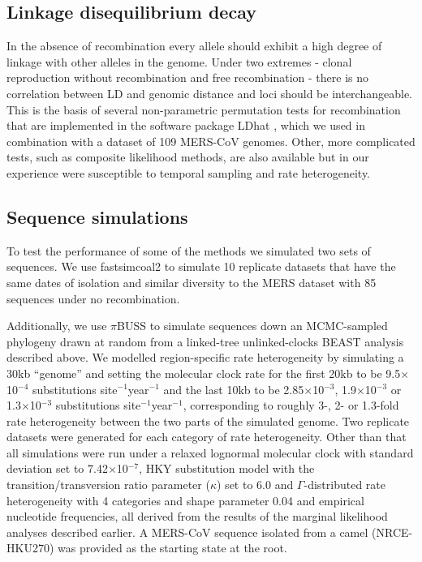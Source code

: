 \documentclass[11pt,oneside,letterpaper]{article}
\begin{document}
\subsection*{Linkage disequilibrium decay}
In the absence of recombination every allele should exhibit a high degree of linkage with other alleles in the genome.
Under two extremes - clonal reproduction without recombination and free recombination - there is no correlation between LD and genomic distance and loci should be interchangeable.
This is the basis of several non-parametric permutation tests for recombination that are implemented in the software package LDhat \citep{mcvean_2002}, which we used in combination with a dataset of 109 MERS-CoV genomes.
Other, more complicated tests, such as composite likelihood methods, are also available but in our experience were susceptible to temporal sampling and rate heterogeneity.

\subsection*{Sequence simulations}
To test the performance of some of the methods we simulated two sets of sequences.
We use fastsimcoal2 \citep{excoffier_2013} to simulate 10 replicate datasets that have the same dates of isolation and similar diversity to the MERS dataset with 85 sequences under no recombination.

Additionally, we use $\pi$BUSS \citep{bielejec_2014} to simulate sequences down an MCMC-sampled phylogeny drawn at random from a linked-tree unlinked-clocks BEAST analysis described above.
We modelled region-specific rate heterogeneity by simulating a 30kb ``genome'' and setting the molecular clock rate for the first 20kb to be 9.5$\times$10$^{-4}$ substitutions site$^{-1}$year$^{-1}$ and the last 10kb to be 2.85$\times$10$^{-3}$, 1.9$\times$10$^{-3}$ or 1.3$\times$10$^{-3}$ substitutions site$^{-1}$year$^{-1}$, corresponding to roughly 3-, 2- or 1.3-fold rate heterogeneity between the two parts of the simulated genome.
Two replicate datasets were generated for each category of rate heterogeneity.
Other than that all simulations were run under a relaxed lognormal molecular clock \citep{drummond_2006} with standard deviation set to 7.42$\times$10$^{-7}$, HKY substitution model \citep{hky_1985} with the transition/transversion ratio parameter ($\kappa$) set to 6.0 and $\Gamma$-distributed rate heterogeneity with 4 categories and shape parameter 0.04 and empirical nucleotide frequencies, all derived from the results of the marginal likelihood analyses described earlier.
A MERS-CoV sequence isolated from a camel (NRCE-HKU270) was provided as the starting state at the root.
\end{document}
